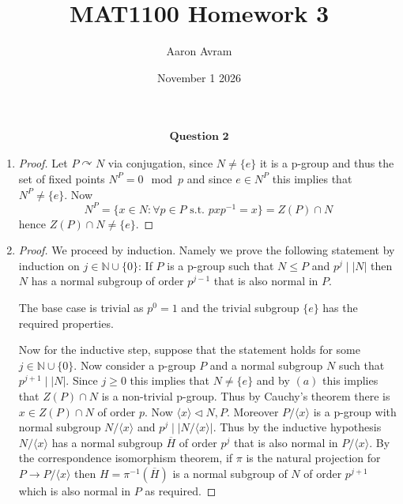 \documentclass[12pt]{article}
\title{MAT1100 Homework 3}
\author{Aaron Avram}
\date{November 1 2026}
\begin{document}
\newtheorem{definition}{Definition}
\newtheorem{theorem}{Theorem}
\newtheorem{claim}{Claim}
\newtheorem{corollary}{Corollary}

\maketitle

\begin{align*}
    \textbf{Question 2}
\end{align*}

\begin{enumerate}
    \item[(a)]
    \begin{proof}
        Let $P \curvearrowright N$ via conjugation, since $N \neq \{ e \}$ it is a p-group
        and thus the set of fixed points $N^P = 0 \mod p$ and since $e \in N^P$ this implies that
        $N^P \neq \{ e \}$. Now
        \[ N^P = \{ x \in N : \forall p \in P \text{ s.t. } pxp^{-1} = x \} = Z(P) \cap N \]
        hence $Z(P) \cap N \neq \{ e \}$.
    \end{proof}

    \item[(b)]
    \begin{proof}
        We proceed by induction. Namely we prove the following statement by induction on $j \in \mathbb N \cup \{ 0 \}$:
        If $P$ is a p-group such that $N \leq P$ and $p^j \mid |N|$ then $N$ has a normal subgroup of order $p^{j-1}$
        that is also normal in $P$.

        The base case is trivial as $p^0 = 1$ and the trivial subgroup $\{ e \}$ has the required properties.

        Now for the inductive step, suppose that the statement holds for some $j \in \mathbb N \cup \{ 0 \}$.
        Now consider a p-group $P$ and a normal subgroup $N$ such that $p^{j+1} \mid |N|$. Since $j \geq 0$
        this implies that $N \neq \{e \}$ and by $(a)$ this implies that $Z(P) \cap N$ is a non-trivial p-group.
        Thus by Cauchy's theorem there is $x \in Z(P) \cap N$ of order $p$. Now $\langle x \rangle \lhd N, P$.
        Moreover $P/\langle x \rangle$ is a p-group with normal subgroup $N/\langle x \rangle$ and $p^j \mid |N/\langle x \rangle|$.
        Thus by the inductive hypothesis $N/\langle x \rangle$ has a normal subgroup $\overline{H}$ of order $p^{j}$
        that is also normal in $P/\langle x \rangle$. By the correspondence isomorphism theorem,
        if $\pi$ is the natural projection for $P \to P/\langle x\rangle$ then $H = \pi^{-1}(\overline{H})$
        is a normal subgroup of $N$ of order $p^{j+1}$ which is also normal in $P$ as required.
    \end{proof}


\end{enumerate}
\end{document}

